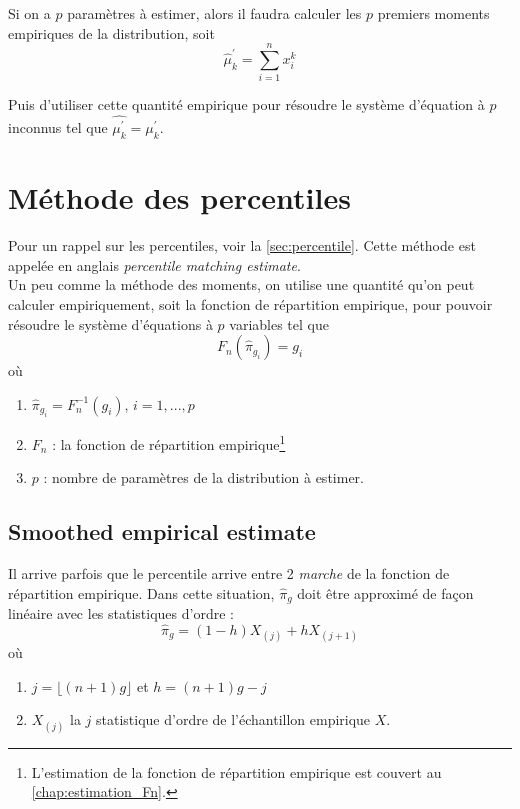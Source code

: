 \documentclass[12pt, french]{report}
\begin{document}
Si on a $p$ paramètres à estimer, alors il faudra calculer les $p$ premiers moments empiriques de la distribution, soit
\begin{equation}
\hat{\mu}_k^\prime = \sum_{i=1}^{n} x_i^k
\end{equation}

Puis d'utiliser cette quantité empirique pour résoudre le système d'équation à $p$ inconnus tel que $\hat{\mu_k^\prime} = \mu_k^\prime$.

\section{Méthode des percentiles}
Pour un rappel sur les percentiles, voir la \autoref{sec:percentile}. Cette méthode est appelée en anglais \emph{percentile matching estimate}. \\

Un peu comme la méthode des moments, on utilise une quantité qu'on peut calculer empiriquement, soit la fonction de répartition empirique, pour pouvoir résoudre le système d'équations à $p$ variables tel que
\[F_n(\hat{\pi}_{g_i}) = g_i \]
où
\begin{enumerate}[label=\faAngleRight]
\item $\hat{\pi}_{g_i} = F_n^{-1}(g_i)$, $i = 1, ... ,p$
\item $F_n$ : la fonction de répartition empirique\footnote{L'estimation de la fonction de répartition empirique est couvert au \autoref{chap:estimation_Fn}.}
\item $p$ : nombre de paramètres de la distribution à estimer.
\end{enumerate}

\subsection{Smoothed empirical estimate}
Il arrive parfois que le percentile arrive entre 2 \emph{marche} de la fonction de répartition empirique. Dans cette situation, $\hat{\pi}_{g}$ doit être approximé de façon linéaire avec les statistiques d'ordre : 
\begin{equation}
\hat{\pi}_g = (1-h) X_{(j)} + h X_{(j+1)}
\end{equation}
où
\begin{enumerate}[label=\faAngleRight]
\item $j = \lfloor (n+1) g \rfloor$ et $h = (n+1) g - j$
\item $X_{(j)}$ la $j$ statistique d'ordre de l'échantillon empirique $X$.

\end{enumerate}
\end{document}
